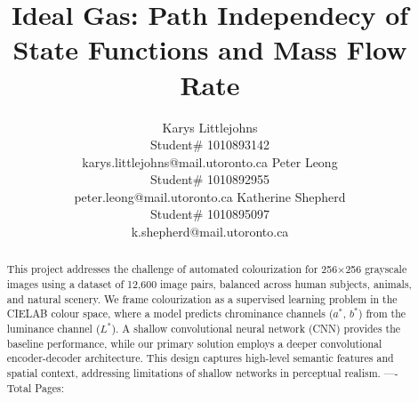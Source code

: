 \documentclass{article} %
\title{Ideal Gas: Path Independecy of State Functions and Mass Flow Rate}
\author{Karys Littlejohns\\
Student\# 1010893142 \\
karys.littlejohns@mail.utoronto.ca
\And
Peter Leong \\
Student\# 1010892955 \\
peter.leong@mail.utoronto.ca 
\AND
Katherine Shepherd \\ 
Student\# 1010895097 \\
k.shepherd@mail.utoronto.ca 
}
\begin{document}
\maketitle

\vspace{-6ex}

\begin{abstract}
This project addresses the challenge of automated colourization for 256$\times$256 grayscale images using a dataset of 12,600 image pairs, balanced across human subjects, 
animals, and natural scenery. We frame colourization as a supervised learning problem in the CIELAB colour space, where a model predicts chrominance channels ($a^*$, $b^*$) 
from the luminance channel ($L^*$). A shallow convolutional neural network (CNN) provides the baseline performance, while our primary solution employs a deeper convolutional 
encoder-decoder architecture. This design captures high-level semantic features and spatial context, addressing limitations of shallow networks in perceptual realism.
----Total Pages: \pageref{last_page}
\end{abstract}

\vspace{2ex}
\end{document}
